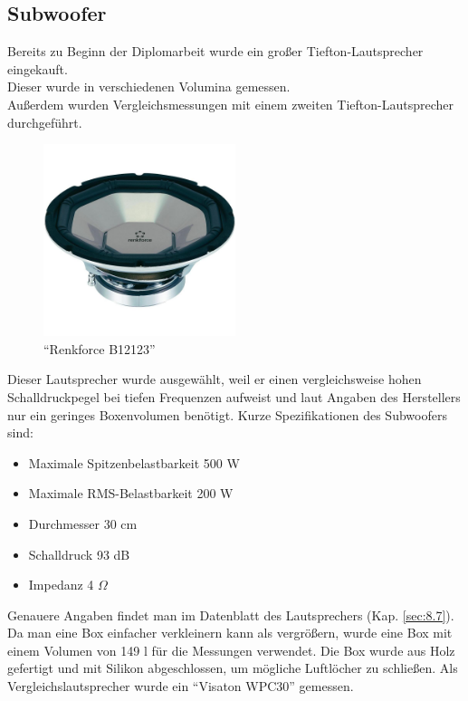 \newpage
\subsection*{Subwoofer} \label{subsec:4.2.3}
Bereits zu Beginn der Diplomarbeit wurde ein großer Tiefton-Lautsprecher eingekauft.\\
Dieser wurde in verschiedenen Volumina gemessen.\\
Außerdem wurden Vergleichsmessungen mit einem zweiten Tiefton-Lautsprecher durchgeführt.
\begin{figure} [H]
	\centering
	\includegraphics[width=0.5\textwidth]{img/LSMessung/TT/renkforce_B12123.png}
	\caption[\enquote{Renkforce B12123}]{\enquote{Renkforce B12123}\footnotemark}
	\label{fig:4.2.3.1}
\end{figure}
Dieser Lautsprecher wurde ausgewählt, weil er einen vergleichsweise hohen Schalldruckpegel bei tiefen Frequenzen aufweist und laut Angaben des Herstellers nur ein geringes Boxenvolumen benötigt.
Kurze Spezifikationen des Subwoofers sind:
\begin{itemize}
	\item Maximale Spitzenbelastbarkeit 500 W
	\item Maximale RMS-Belastbarkeit 200 W
	\item Durchmesser 30 cm
	\item Schalldruck 93 dB
	\item Impedanz 4 $\Omega$
\end{itemize}
Genauere Angaben findet man im Datenblatt des Lautsprechers (Kap. \ref{sec:8.7}).
Da man eine Box einfacher verkleinern kann als vergrößern, wurde eine Box mit einem Volumen von 149 l für die Messungen verwendet.
Die Box wurde aus Holz gefertigt und mit Silikon abgeschlossen, um mögliche Luftlöcher zu schließen.
Als Vergleichslautsprecher wurde ein \enquote{Visaton WPC30} gemessen.


